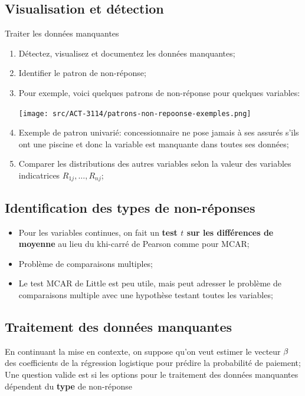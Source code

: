 \documentclass[10pt, french]{article}
\begin{document}
\begin{multicols*}{3}
\subsection*{Visualisation et détection}
\begin{algo}{Traiter les données manquantes}
\begin{enumerate}[leftmargin = *]
	\item	Détectez, visualisez et documentez les données manquantes;
	\item	Identifier le patron de non-réponse;
	\item[]	Pour exemple, voici quelques patrons de non-réponse pour quelques variables:

	\texttt{[image: src/ACT-3114/patrons-non-repoonse-exemples.png]}
	\item[]	Exemple de patron univarié: concessionnaire ne pose jamais à ses assurés s'ils ont une piscine et donc la variable est manquante dans toutes ses données;
	\item	Comparer les distributions des autres variables selon la valeur des variables indicatrices $R_{1j}, \dots, R_{nj}$;
\end{enumerate}
\end{algo}

\subsection*{Identification des types de non-réponses}
\begin{itemize}[leftmargin = *]
	\item	Pour les variables continues, on fait un \textbf{test $t$ sur les différences de moyenne} au lieu du khi-carré de Pearson comme pour MCAR;
	\item	Problème de comparaisons multiples;
	\item	Le test MCAR de Little est peu utile, mais peut adresser le problème de comparaisons multiple avec une hypothèse testant toutes les variables;
\end{itemize}

\subsection*{Traitement des données manquantes}

En continuant la mise en contexte, on suppose qu'on veut estimer le vecteur $\mathbf{\beta}$ des coefficients de la régression logistique pour prédire la probabilité de paiement;
Une question valide est si les options pour le traitement des données manquantes dépendent du \textbf{type} de non-réponse


\end{multicols*}
\end{document}

